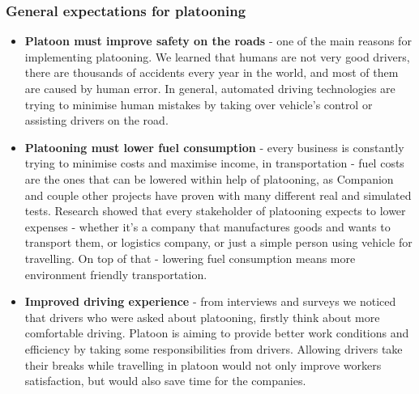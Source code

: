 \subsubsection{General expectations for platooning}
%
\begin{itemize}
    \item\textbf{Platoon must improve safety on the roads} - one of the main reasons for implementing platooning. We learned that humans are not very good drivers, there are thousands of accidents every year in the world, and most of them are caused by human error. In general, automated driving technologies are trying to minimise human mistakes by taking over vehicle's control or assisting drivers on the road.
    \item\textbf{Platooning must lower fuel consumption} - every business is constantly trying to minimise costs and maximise income, in transportation - fuel costs are the ones that can be lowered within help of platooning, as Companion and couple other projects have proven with many different real and simulated tests. Research showed that every stakeholder of platooning expects to lower expenses - whether it's a company that manufactures goods and wants to transport them, or logistics company, or just a simple person using vehicle for travelling. On top of that - lowering fuel consumption means more environment friendly transportation.
    \item\textbf{Improved driving experience} - from interviews and surveys we noticed that drivers who were asked about platooning, firstly think about more comfortable driving. Platoon is aiming to provide better work conditions and efficiency by taking some responsibilities from drivers. Allowing drivers take their breaks while travelling in platoon would not only improve workers satisfaction, but would also save time for the companies.
\end{itemize}
%
